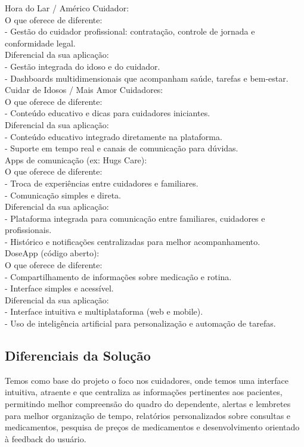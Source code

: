 Hora do Lar / Américo Cuidador:\\
 O que oferece de diferente:\\
-  Gestão do cuidador profissional: contratação, controle de jornada e conformidade legal.\\
 Diferencial da sua aplicação:\\
-  Gestão integrada do idoso e do cuidador.\\
-  Dashboards multidimensionais que acompanham saúde, tarefas e bem-estar.\\

Cuidar de Idosos / Mais Amor Cuidadores:\\
 O que oferece de diferente:\\
-  Conteúdo educativo e dicas para cuidadores iniciantes.\\
 Diferencial da sua aplicação:\\
-  Conteúdo educativo integrado diretamente na plataforma.\\
-  Suporte em tempo real e canais de comunicação para dúvidas.\\

Apps de comunicação (ex: Hugs Care):\\
 O que oferece de diferente:\\
-  Troca de experiências entre cuidadores e familiares.\\
-  Comunicação simples e direta.\\
 Diferencial da sua aplicação:\\
-  Plataforma integrada para comunicação entre familiares, cuidadores e profissionais.\\
-  Histórico e notificações centralizadas para melhor acompanhamento.\\

DoseApp (código aberto):\\
 O que oferece de diferente:\\
-  Compartilhamento de informações sobre medicação e rotina.\\
-  Interface simples e acessível.\\
Diferencial da sua aplicação:\\
-  Interface intuitiva e multiplataforma (web e mobile).\\
-  Uso de inteligência artificial para personalização e automação de tarefas.\\
\subsection*{Diferenciais da Solução}
Temos como base do projeto o foco nos cuidadores, onde temos uma interface intuitiva, atraente e que centraliza as informações pertinentes aos pacientes, permitindo melhor compreensão do quadro do dependente, alertas e lembretes para melhor organização de tempo, relatórios personalizados sobre consultas e medicamentos, pesquisa de preços de medicamentos e desenvolvimento orientado à feedback do usuário. 

